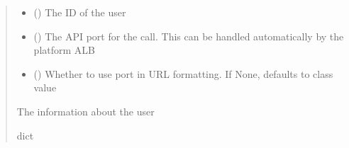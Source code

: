 \documentclass[letterpaper,10pt,english]{sphinxmanual}
\begin{document}
\begin{fulllineitems}
\begin{fulllineitems}
\begin{sphinxVerbatim}[commandchars=\\\{\}]
 
  
\end{sphinxVerbatim}
\begin{quote}\begin{description}
\begin{itemize}
\item {} 
\sphinxAtStartPar
{} () \textendash{} The ID of the user

\item {} 
\sphinxAtStartPar
{} (\sphinxstyleliteralemphasis{\sphinxupquote{ (}}\sphinxstyleliteralemphasis{\sphinxupquote{)}}) \textendash{} The API port for the call. This can be handled automatically by the platform ALB

\item {} 
\sphinxAtStartPar
{} (\sphinxstyleliteralemphasis{\sphinxupquote{ (}}\sphinxstyleliteralemphasis{\sphinxupquote{)}}) \textendash{} Whether to use port in URL formatting. If None, defaults to class value

\end{itemize}

\sphinxAtStartPar
{} \textendash{} The information about the user

\sphinxAtStartPar
dict

\end{description}\end{quote}


\end{fulllineitems}
\end{fulllineitems}
\end{document}
